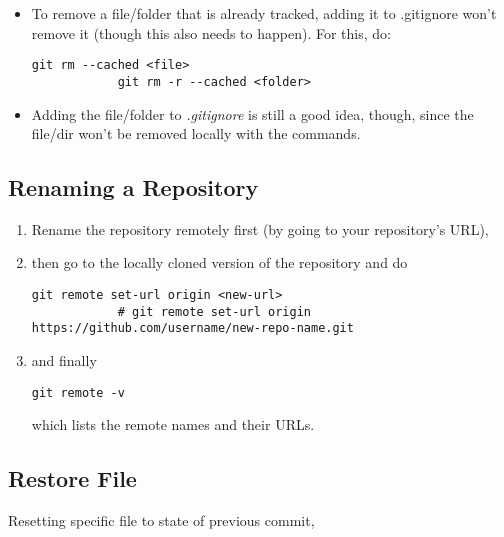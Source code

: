 \documentclass[12pt, a4paper]{article}
\numberwithin{equation}{section}
\theoremstyle{definition}
\theoremstyle{definition}
\begin{document}
	\begin{itemize}
		\item To remove a file/folder that is already tracked, adding it to .gitignore won’t remove it (though this also needs to happen). For this, do:
		
		\begin{lstlisting}[style=mystylebash, label=alg:git_remove, xleftmargin=\parindent]
			git rm --cached <file>
			git rm -r --cached <folder>
		\end{lstlisting}

		\item Adding the file/folder to \textit{.gitignore} is still a good idea, though, since the file/dir won’t be removed locally with the commands.
	\end{itemize}
	
	\subsection{Renaming a Repository}
	
	\begin{enumerate}
		\item Rename the repository remotely first (by going to your repository's URL), 
		\item then go to the locally cloned version of the repository and do
		
		\begin{lstlisting}[style=mystylebash, label=alg:git__rename_repo, xleftmargin=\parindent]
			git remote set-url origin <new-url>
			# git remote set-url origin https://github.com/username/new-repo-name.git 
		\end{lstlisting}
		
		\item and finally 
		
		\begin{lstlisting}[style=mystylebash, label=alg:git__check_remote_url, xleftmargin=\parindent]
			git remote -v
		\end{lstlisting}
		
		which lists the remote names and their URLs.
		
	\end{enumerate}

	\subsection{Restore File}
	
		Resetting specific file to state of previous commit,
		
\end{document}
